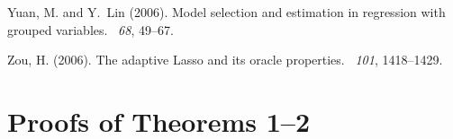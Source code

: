 \documentclass[authoryear,review, 12pt]{elsarticle}
\begin{document}
\begin{thebibliography}{}
Yuan, M. and Y.~Lin (2006).
\newblock Model selection and estimation in regression with grouped variables.
~{\em 68},
  49--67.

Zou, H. (2006).
\newblock The adaptive {L}asso and its oracle properties.
~{\em 101},
  1418--1429.

\end{thebibliography}

\clearpage

\appendix
\section{Proofs of Theorems 1--2}
\end{document}
